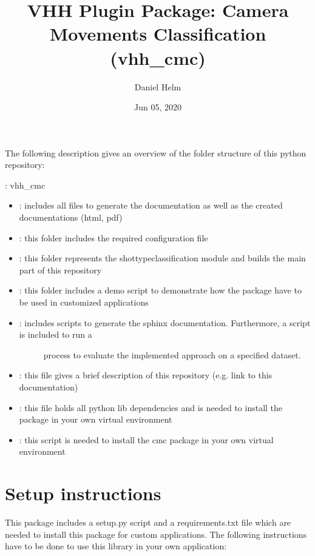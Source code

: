 \documentclass[letterpaper,10pt,english,openany,oneside]{sphinxmanual}
\title{VHH Plugin Package: Camera Movements Classification (vhh\_cmc)}
\date{Jun 05, 2020}
\author{Daniel Helm}
\begin{document}
\pagestyle{empty}
\sphinxmaketitle
\pagestyle{plain}
\sphinxtableofcontents
\pagestyle{normal}
\label{\detokenize{index::doc}}


The following description gives an overview of the folder structure of this python repository:

: vhh\_cmc
\begin{itemize}
\item {} 
: includes all files to generate the documentation as well as the created documentations (html, pdf)

\item {} 
: this folder includes the required configuration file

\item {} 
: this folder represents the shot\sphinxhyphen{}type\sphinxhyphen{}classification module and builds the main part of this repository

\item {} 
: this folder includes a demo script to demonstrate how the package have to be used in customized applications

\item {} \begin{description}
\item[{: includes scripts to generate the sphinx documentation. Furthermore, a script is included to run a}] \leavevmode
process to evaluate the implemented approach on a specified dataset.

\end{description}

\item {} 
: this file gives a brief description of this repository (e.g. link to this documentation)

\item {} 
: this file holds all python lib dependencies and is needed to install the package in your own virtual environment

\item {} 
: this script is needed to install the cmc package in your own virtual environment

\end{itemize}


\chapter{Setup  instructions}
\label{\detokenize{index:setup-instructions}}
This package includes a setup.py script and a requirements.txt file which are needed to install this package for custom
applications. The following instructions have to be done to use this library in your own application:
\end{document}
